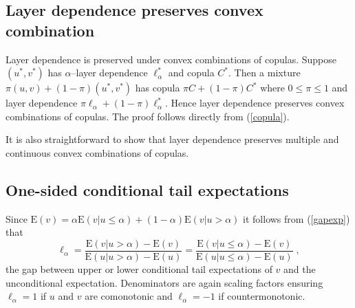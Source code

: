 \documentclass[authoryear]{elsarticle}
\newcommand{\E}{{\mathrm E}}
\newcommand{\de}{\mathrm{d}}
\newcommand{\eref}[1]{(\ref{#1})}
\begin{document}
\subsection{Layer dependence preserves convex combination}

Layer dependence is preserved under convex combinations of copulas.  Suppose $(u^*,v^*)$ has  $\alpha$--layer dependence $\ell_\alpha^*$ and copula $C^*$. Then a mixture $\pi(u,v)+(1-\pi)(u^*,v^*)$ has  copula $\pi C+(1-\pi)C^*$ where $0\le \pi\le 1$ and layer dependence $\pi\ell_\alpha+(1-\pi)\ell_\alpha^*$. Hence layer dependence preserves convex combinations of copulas. The proof follows directly from \eref{copula}.

It is also straightforward to show that layer dependence preserves multiple and continuous convex combinations of copulas.



\subsection{One-sided conditional tail expectations}


Since $\E(v)=\alpha\E(v|u\leq \alpha)+(1-\alpha)\E(v|u>\alpha)$ it follows from \eref{gapexp} that
$$
\ell_\alpha = \frac{\E(v|u> \alpha)-\E(v)}{\E(u|u> \alpha)-\E(u)} = \frac{\E(v|u\leq \alpha)-\E(v)}{\E(u|u\leq \alpha)-\E(u)} \;,
$$
the gap between upper or lower conditional tail expectations of $v$ and the unconditional expectation. Denominators are again scaling factors ensuring $\ell_\alpha=1$ if $u$ and $v$ are comonotonic and $\ell_\alpha=-1$ if countermonotonic.

\end{document}
